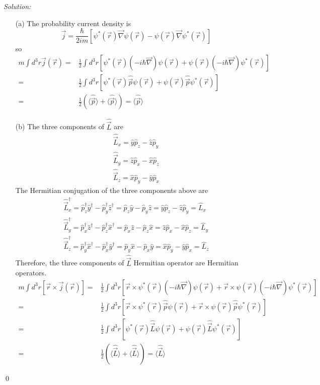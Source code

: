 \documentclass[12pt,a4paper]{article}
\newenvironment{sol}
    {\emph{Solution:}
    }
    {
    \qed
    }
\begin{document}
\begin{sol}
\begin{itemize}
\item[(a)] The probability current density is
\begin{equation}
\vec{j}=\frac{\hbar}{2im}[\psi^*(\vec{r})\vec{\nabla}\psi(\vec{r})-\psi(\vec{r})\vec{\nabla}\psi^*(\vec{r})]
\end{equation}
so
\begin{align}
\nonumber m\int d^3r\vec{j}(\vec{r})=&\frac{1}{2}\int d^3r[\psi^*(\vec{r})(-i\hbar\vec{\nabla})\psi(\vec{r})+\psi(\vec{r})(-i\hbar\vec{\nabla})\psi^*(\vec{r})]\\
\nonumber=&\frac{1}{2}\int d^3r[\psi^*(\vec{r})\hat{\vec{p}}\psi(\vec{r})+\psi(\vec{r})\hat{\vec{p}}\psi^*(\vec{r})]\\
=&\frac{1}{2}(\langle\hat{\vec{p}}\rangle+\langle\hat{\vec{p}}\rangle)=\langle\hat{\vec{p}}\rangle
\end{align}
\item[(b)] The three components of $\hat{\vec{L}}$ are
\begin{gather}
\hat{\vec{L}}_x=\hat{y}\hat{p}_z-\hat{z}\hat{p}_y\\
\hat{\vec{L}}_y=\hat{z}\hat{p}_x-\hat{x}\hat{p}_z\\
\hat{\vec{L}}_z=\hat{x}\hat{p}_y-\hat{y}\hat{p}_x
\end{gather}
The Hermitian conjugation of the three components above are
\begin{gather}
\hat{\vec{L}}_x^{\dagger}=\hat{p}_z^{\dagger}\hat{y}^{\dagger}-\hat{p}_y^{\dagger}\hat{z}^{\dagger}=\hat{p}_z\hat{y}-\hat{p}_y\hat{z}=\hat{y}\hat{p}_z-\hat{z}\hat{p}_y=\hat{L}_x\\
\hat{\vec{L}}_y^{\dagger}=\hat{p}_x^{\dagger}\hat{z}^{\dagger}-\hat{p}_z^{\dagger}\hat{x}^{\dagger}=\hat{p}_x\hat{z}-\hat{p}_z\hat{x}=\hat{z}\hat{p}_x-\hat{x}\hat{p}_z=\hat{L}_y\\
\hat{\vec{L}}_z^{\dagger}=\hat{p}_y^{\dagger}\hat{x}^{\dagger}-\hat{p}_x^{\dagger}\hat{y}^{\dagger}=\hat{p}_y\hat{x}-\hat{p}_x\hat{y}=\hat{x}\hat{p}_y-\hat{y}\hat{p}_x=\hat{L}_z
\end{gather}
Therefore, the three components of $\hat{\vec{L}}$ Hermitian operator are Hermitian operators.\\
\begin{align}
\nonumber m\int d^3r[\vec{r}\times\vec{j}(\vec{r})]=&\frac{1}{2}\int d^3r[\vec{r}\times\psi^*(\vec{r})(-i\hbar\vec{\nabla})\psi(\vec{r})+\vec{r}\times\psi(\vec{r})(-i\hbar\vec{\nabla})\psi^*(\vec{r})]\\
\nonumber=&\frac{1}{2}\int d^3r[\vec{r}\times\psi^*(\vec{r})\hat{\vec{p}}\psi(\vec{r})+\vec{r}\times\psi(\vec{r})\hat{\vec{p}}\psi^*(\vec{r})]\\
\nonumber=&\frac{1}{2}\int d^3r[\psi^*(\vec{r})\hat{\vec{L}}\psi(\vec{r})+\psi(\vec{r})\hat{\vec{L}}\psi^*(\vec{r})]\\
=&\frac{1}{2}(\langle\hat{\vec{L}}\rangle+\langle\hat{\vec{L}}\rangle)=\langle\hat{\vec{L}}\rangle
\end{align}
\end{itemize}
\end{sol}
\end{document}

